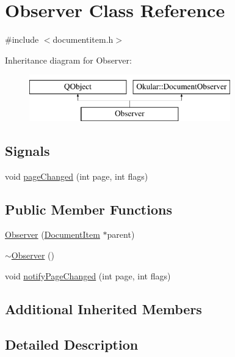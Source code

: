 \hypertarget{classObserver}{\section{Observer Class Reference}
\label{classObserver}
}


{\ttfamily \#include $<$documentitem.\+h$>$}

Inheritance diagram for Observer\+:\begin{figure}[H]
\begin{center}
\leavevmode
\includegraphics[height=2.000000cm]{classObserver}
\end{center}
\end{figure}
\subsection*{Signals}
\begin{DoxyCompactItemize}
\item 
void \hyperlink{classObserver_a7e3f4b35d8621f4473718549eb2cdcf0}{page\+Changed} (int page, int flags)
\end{DoxyCompactItemize}
\subsection*{Public Member Functions}
\begin{DoxyCompactItemize}
\item 
\hyperlink{classObserver_a6c69c54717faabf25645cf07711160e4}{Observer} (\hyperlink{classDocumentItem}{Document\+Item} $\ast$parent)
\item 
\hyperlink{classObserver_a450645e61c136826f09940a1334c7f34}{$\sim$\+Observer} ()
\item 
void \hyperlink{classObserver_a034b1a4d0b38f9c4adc1e0502c650bfb}{notify\+Page\+Changed} (int page, int flags)
\end{DoxyCompactItemize}
\subsection*{Additional Inherited Members}


\subsection{Detailed Description}


